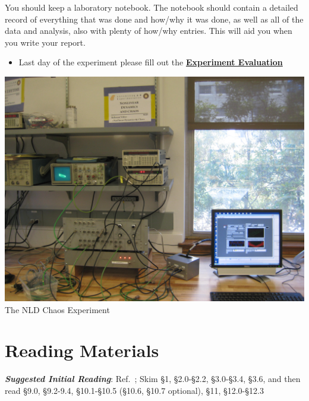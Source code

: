 \documentclass{../lab}
\begin{document}
You should keep a laboratory notebook. The notebook should contain a detailed record of everything that was done and how/why it was done, as well as all of the data and analysis, also with plenty of how/why entries. This will aid you when you write your report.

\begin{itemize}
    \item Last day of the experiment please fill out the \href{\ExperimentEvaluation}{\textbf{Experiment Evaluation}}
\end{itemize}

\begin{center}
    \href{http://experimentationlab.berkeley.edu/sites/default/files/images/NLD_3516.jpg}{\includegraphics[width=0.7\linewidth,keepaspectratio]{images/NLD_3516.jpg}} \\
    The NLD Chaos Experiment
\end{center}

\section{Reading Materials}

\emph{\textbf{Suggested Initial Reading}}: Ref.~\cite{Strogatz}; Skim \S1, \S2.0-\S2.2, \S3.0-\S3.4, \S3.6, and then read \S9.0, \S9.2-9.4, \S10.1-\S10.5 (\S10.6, \S10.7 optional), \S11, \S12.0-\S12.3
\end{document}
